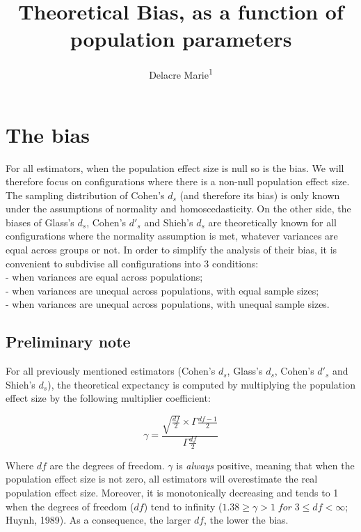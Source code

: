 \documentclass[
  man]{apa6}
\affiliation{
\vspace{0.5cm}
\textsuperscript{1} ULB}
\title{Theoretical Bias, as a function of population parameters}
\author{Delacre Marie\textsuperscript{1}}
\date{}
\begin{document}
\maketitle

\hypertarget{the-bias}{%
\section{The bias}\label{the-bias}}

For all estimators, when the population effect size is null so is the bias. We will therefore focus on configurations where there is a non-null population effect size. The sampling distribution of Cohen's \(d_s\) (and therefore its bias) is only known under the assumptions of normality and homoscedasticity. On the other side, the biases of Glass's \(d_s\), Cohen's \(d'_s\) and Shieh's \(d_s\) are theoretically known for all configurations where the normality assumption is met, whatever variances are equal across groups or not. In order to simplify the analysis of their bias, it is convenient to subdivise all configurations into 3 conditions:\\
- when variances are equal across populations;\\
- when variances are unequal across populations, with equal sample sizes;\\
- when variances are unequal across populations, with unequal sample sizes.

\hypertarget{preliminary-note}{%
\subsection{Preliminary note}\label{preliminary-note}}

For all previously mentioned estimators (Cohen's \(d_s\), Glass's \(d_s\), Cohen's \(d'_s\) and Shieh's \(d_s\)), the theoretical expectancy is computed by multiplying the population effect size by the following multiplier coefficient:

\begin{equation} 
\gamma=\frac{\sqrt{\frac{df}{2}} \times \Gamma{\frac{df-1}{2}}}{\Gamma{\frac{df}{2}}}
\label{eq:mc}
\end{equation}

Where \(df\) are the degrees of freedom. \(\gamma\) is \emph{always} positive, meaning that when the population effect size is not zero, all estimators will overestimate the real population effect size. Moreover, it is monotonically decreasing and tends to 1 when the degrees of freedom (\(df\)) tend to infinity (\(1.38 \ge \gamma > 1 \; for \; 3 \le df < \infty\); Huynh, 1989). As a consequence, the larger \(df\), the lower the bias.
\end{document}

